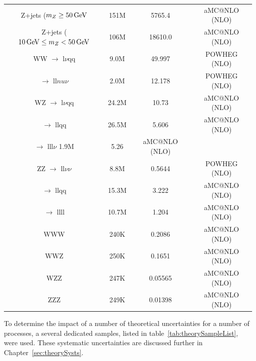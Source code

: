 \begin{table}[htbp]
{\begin{tabular}{cccc}
   \hline
   Z+jets ($m_{Z} \geq 50\,\text{Ge\hspace{-.08em}V} $ & 151M & 5765.4 & aMC@NLO (NLO) \\
   Z+jets ($10 \,\text{Ge\hspace{-.08em}V} \leq m_{Z} < 50\,\text{Ge\hspace{-.08em}V}$ & 106M & 18610.0 & aMC@NLO (NLO) \\
   \hline
   WW $\rightarrow$ l$\nu$qq & 9.0M & 49.997  & POWHEG (NLO) \\
      $\rightarrow$ ll$nu\nu$ & 2.0M & 12.178 & POWHEG (NLO) \\
   \hline
   WZ $\rightarrow$ l$\nu$qq & 24.2M & 10.73 & aMC@NLO (NLO) \\
      $\rightarrow$ llqq & 26.5M & 5.606 & aMC@NLO (NLO) \\
      $\rightarrow$ lll$\nu$ 1.9M & 5.26 & aMC@NLO (NLO) \\
   \hline
   ZZ $\rightarrow$ ll$\nu\nu$ & 8.8M & 0.5644 & POWHEG (NLO) \\
      $\rightarrow$ llqq & 15.3M & 3.222 & aMC@NLO (NLO) \\
      $\rightarrow$ llll & 10.7M & 1.204 & aMC@NLO (NLO) \\
   \hline
   WWW & 240K & 0.2086 & aMC@NLO (NLO) \\
   \hline
   WWZ & 250K & 0.1651 & aMC@NLO (NLO) \\
   \hline
   WZZ & 247K & 0.05565 & aMC@NLO (NLO) \\
   \hline
   ZZZ & 249K & 0.01398 & aMC@NLO (NLO) \\
   \hline
   
 \end{tabular}}
\end{table}

To determine the impact of a number of theoretical uncertainties for a number of processes, a several dedicated samples, listed in table~\ref{tab:theorySampleList}, were used.
These systematic uncertainties are discussed further in Chapter~\ref{sec:theorySysts}.

